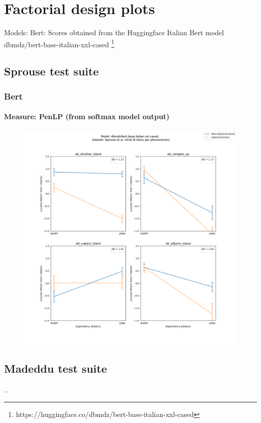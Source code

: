 \chapter{Factorial design plots}

Models:
Bert: Scores obtained from the Huggingface Italian Bert model dbmdz/bert-base-italian-xxl-cased \footnote{https://huggingface.co/dbmdz/bert-base-italian-xxl-cased}

\clearpage
\section{Sprouse test suite}
\subsection{Bert}
\subsubsection{Measure: PenLP (from softmax model output)}
\begin{figure}[h]
	\centering
	\includegraphics[width=1\textwidth]{images/Chapter1/Sprouse_wh_dbmdz_bert-base-italian-xxl-cased_PenLP-zscores-likert-2022-07-11.png} 
\end{figure}



\section{Madeddu test suite}
..